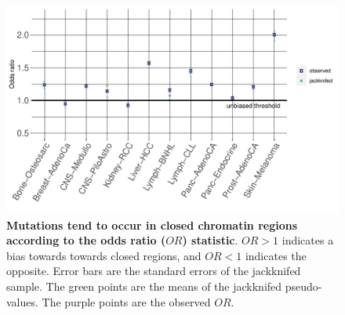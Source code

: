 \begin{figure}[h!]
    \centering
    \includegraphics[scale=0.8]{graphics/jackknife_OR.pdf}
    \caption{\textbf{Mutations tend to occur in closed chromatin regions according to the odds ratio ($OR$) statistic}. $OR>1$ indicates a bias towards towards closed regions, and $OR<1$ indicates the opposite. Error bars are the standard errors of the jackknifed sample. The green points are the means of the jackknifed pseudo-values. The purple points are the observed $OR$.}
    \label{fig:or_jackknifed}
\end{figure}
